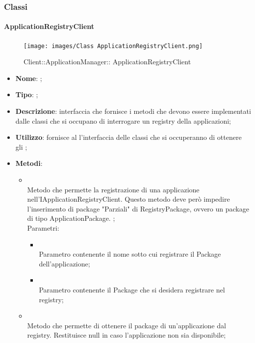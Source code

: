 \subsubsection{Classi}
\hypertarget{ ApplicationRegistryClient_label}{\paragraph{ ApplicationRegistryClient}}
\begin{figure}[h]
	\centering
	\texttt{[image: images/Class ApplicationRegistryClient.png]}
	\caption{Client::ApplicationManager:: ApplicationRegistryClient}
\end{figure}
\begin{itemize}
	\item \textbf{Nome}: ;
	\item \textbf{Tipo}: ;
	\item \textbf{Descrizione}: interfaccia che fornisce i metodi che devono essere implementati dalle classi che si occupano di interrogare un registry della applicazioni;
	\item \textbf{Utilizzo}: fornisce al  l'interfaccia delle classi che si occuperanno di ottenere gli ;
	\item \textbf{Metodi}:
	\begin{itemize}
		\item[]  \\
		Metodo che permette la registrazione di una applicazione nell'IApplicationRegistryClient. Questo metodo deve però impedire l'inserimento di package "Parziali" di RegistryPackage, ovvero un package di tipo ApplicationPackage. ;\\
		Parametri:
		\begin{itemize}
			\item {} \\
			Parametro contenente il nome sotto cui registrare il Package dell'applicazione;
			\item {} \\
			Parametro contenente il Package che si desidera registrare nel registry;
		\end{itemize}
		\item[]  \\
		Metodo che permette di ottenere il package di un'applicazione dal registry. Restituisce null in caso l'applicazione non sia disponibile;\\

\end{itemize}
\end{itemize}
